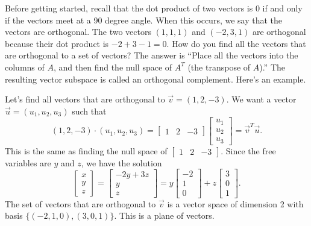 Before getting started, recall that the dot product of two vectors is 0 if and only if the vectors meet at a 90 degree angle. When this occurs, we say that the vectors are orthogonal.
The two vectors $(1,1,1)$ and $(-2,3,1)$ are orthogonal because their dot product is $-2+3-1=0$.  How do you find all the vectors that are orthogonal to a set of vectors? The answer is ``Place all the vectors into the columns of $A$, and then find the null space of $A^T$ (the transpose of $A$).'' The resulting vector subspace is called an orthogonal complement. 
Here's an example.

\begin{example}
Let's find all vectors that are orthogonal to $\vec v = (1,2,-3)$.  We want a vector $\vec u = (u_1,u_2,u_3)$ such that 
$$
(1,2,-3)\cdot(u_1,u_2,u_3) 
=
\begin{bmatrix}1&2&-3\end{bmatrix}
\begin{bmatrix}u_1\\u_2\\u_3\end{bmatrix}
=\vec v^T \vec u.
$$
This is the same as finding the null space of $\begin{bmatrix}1&2&-3\end{bmatrix}$. Since the free variables are $y$ and $z$, we have the solution 
$$
\begin{bmatrix}
x\\y\\z
\end{bmatrix}
=
\begin{bmatrix}
-2y+3z\\y\\z
\end{bmatrix}
=y
\begin{bmatrix}
-2\\1\\0
\end{bmatrix}
+z\begin{bmatrix}
3\\0\\1
\end{bmatrix}
.$$
The set of vectors that are orthogonal to $\vec v$ is a vector space of dimension 2 with basis $\{(-2,1,0),(3,0,1)\}$. This is a plane of vectors.
\end{example}

